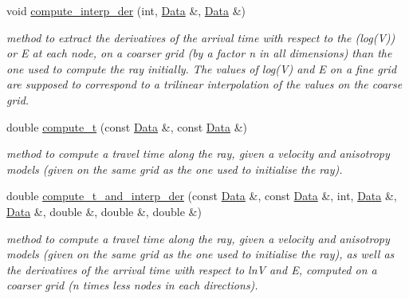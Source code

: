 \begin{DoxyCompactItemize}
\item 
void \hyperlink{class_ray_a1133e78e15ac3cd0feb2bc67d1033b68}{compute\+\_\+interp\+\_\+der} (int, \hyperlink{class_data}{Data} \&, \hyperlink{class_data}{Data} \&)
\begin{DoxyCompactList}\small\item\em method to extract the derivatives of the arrival time with respect to the (log(\+V)) or E at each node, on a coarser grid (by a factor n in all dimensions) than the one used to compute the ray initially. The values of log(\+V) and E on a fine grid are supposed to correspond to a trilinear interpolation of the values on the coarse grid. \end{DoxyCompactList}\item 
double \hyperlink{class_ray_a56bc210ab5c67d0268a10fb4cc15dc71}{compute\+\_\+t} (const \hyperlink{class_data}{Data} \&, const \hyperlink{class_data}{Data} \&)
\begin{DoxyCompactList}\small\item\em method to compute a travel time along the ray, given a velocity and anisotropy models (given on the same grid as the one used to initialise the ray). \end{DoxyCompactList}\item 
double \hyperlink{class_ray_afe6a19d9cffac14fda35259562887930}{compute\+\_\+t\+\_\+and\+\_\+interp\+\_\+der} (const \hyperlink{class_data}{Data} \&, const \hyperlink{class_data}{Data} \&, int, \hyperlink{class_data}{Data} \&, \hyperlink{class_data}{Data} \&, double \&, double \&, double \&)
\begin{DoxyCompactList}\small\item\em method to compute a travel time along the ray, given a velocity and anisotropy models (given on the same grid as the one used to initialise the ray), as well as the derivatives of the arrival time with respect to ln\+V and E, computed on a coarser grid (n times less nodes in each directions). \end{DoxyCompactList}\end{DoxyCompactItemize}
